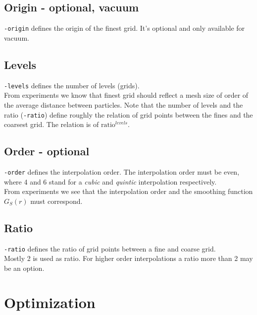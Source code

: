 \documentclass[11pt]{article}
\begin{document}
\subsection{Origin - optional, vacuum}
\texttt{-origin} defines the origin of the finest grid. It's optional
and only available for vacuum.


\subsection{Levels}

\texttt{-levels} defines the number of levels (grids).
\\
From experiments we know that finest grid should reflect a mesh size
of order of the average distance between particles. Note that the number of
levels and the ratio (\texttt{-ratio}) define roughly the relation of
grid points between the fines and the coarsest grid. The relation is of
 $\mbox{ratio}^{levels}$.

\subsection{Order - optional}

\texttt{-order} defines the interpolation order. The interpolation
order must be even, where 4 and 6 stand for a {\it cubic} and
{\it quintic} interpolation respectively.
\\
From experiments we see that the interpolation order and the smoothing
function $G_S(r)$ must correspond.

\subsection{Ratio}

\texttt{-ratio} defines the ratio of grid points between a fine and
coarse grid.
\\
Mostly 2 is used as ratio. For higher order interpolations a ratio
more than 2 may be an option.

\section{Optimization}
\end{document}
